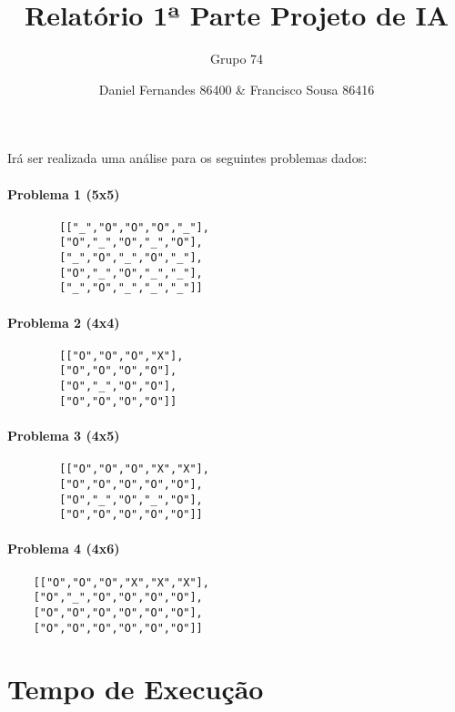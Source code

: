 \documentclass[12pt,a4paper]{article}
\author{Grupo 74 \and Daniel Fernandes 86400 \& Francisco Sousa 86416}
\title{Relatório 1ª Parte Projeto de IA}
\begin{document}
\maketitle


Irá ser realizada uma análise para os seguintes problemas dados:

\begin{multicols}{2}
	\paragraph{Problema 1 (5x5)}
	\begin{verbatim}
		[["_","O","O","O","_"],
		["O","_","O","_","O"],
		["_","O","_","O","_"],
		["O","_","O","_","_"],
		["_","O","_","_","_"]]
	\end{verbatim}
	\paragraph{Problema 2 (4x4)}
	\begin{verbatim}
		[["O","O","O","X"],
		["O","O","O","O"],
		["O","_","O","O"],
		["O","O","O","O"]]
	\end{verbatim}
	\paragraph{Problema 3 (4x5)}
	\begin{verbatim}
		[["O","O","O","X","X"],
		["O","O","O","O","O"],
		["O","_","O","_","O"],
		["O","O","O","O","O"]]
	\end{verbatim}
	\paragraph{Problema 4 (4x6)}
	\begin{verbatim}
	[["O","O","O","X","X","X"],
	["O","_","O","O","O","O"],
	["O","O","O","O","O","O"],
	["O","O","O","O","O","O"]]
	\end{verbatim}
\end{multicols}


\section{Tempo de Execução}
\end{document}
